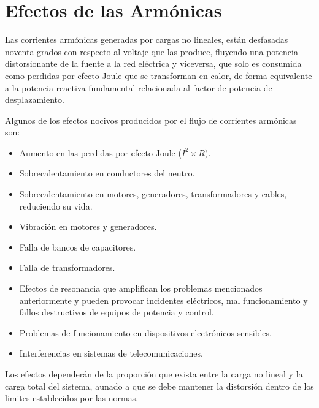 \section{Efectos de las Armónicas}

Las corrientes armónicas generadas por cargas no lineales, están desfasadas noventa grados con respecto al voltaje que las produce, fluyendo una potencia distorsionante de la fuente a la red eléctrica y viceversa, que solo es consumida como perdidas por efecto Joule que se transforman en calor, de forma equivalente a la potencia reactiva fundamental relacionada al factor de potencia de desplazamiento.

Algunos de los efectos nocivos producidos por el flujo de corrientes armónicas son:

\begin{itemize}
    \item Aumento en las perdidas por efecto Joule (${I^2} \times R$).
    \item Sobrecalentamiento en conductores del neutro.
    \item Sobrecalentamiento en motores, generadores, transformadores y cables, reduciendo su vida.
    \item Vibración en motores y generadores.
    \item Falla de bancos de capacitores.
    \item Falla de transformadores.
    \item Efectos de resonancia que amplifican los problemas mencionados anteriormente y pueden provocar incidentes eléctricos, mal funcionamiento y fallos destructivos de equipos de potencia y control.
    \item Problemas de funcionamiento en dispositivos electrónicos sensibles.
    \item Interferencias en sistemas de telecomunicaciones.
\end{itemize}

Los efectos dependerán de la proporción que exista entre la carga no lineal y la carga total del sistema, aunado a que se debe mantener la distorsión dentro de los limites establecidos por las normas.